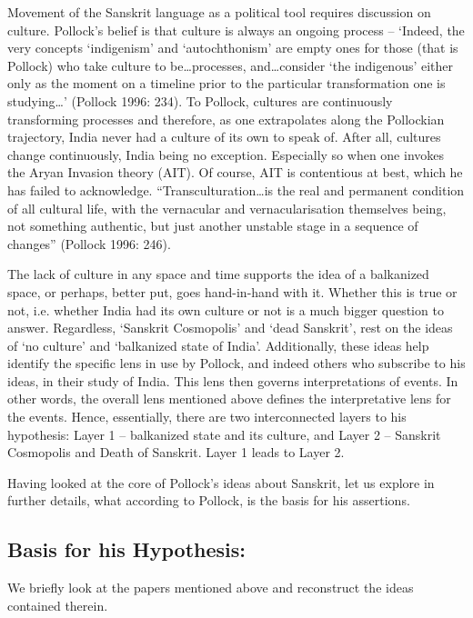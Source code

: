 Movement of the Sanskrit language as a political tool requires discussion on culture. Pollock’s belief is that culture is always an ongoing process – ‘Indeed, the very concepts ‘indigenism’ and ‘autochthonism’ are empty ones for those (that is Pollock) who take culture to be…processes, and…consider ‘the indigenous’ either only as the moment on a timeline prior to the particular transformation one is studying…’ (Pollock 1996: 234). To Pollock, cultures are continuously transforming processes and therefore, as one extrapolates along the Pollockian trajectory, India never had a culture of its own to speak of. After all, cultures change continuously, India being no exception. Especially so when one invokes the Aryan Invasion theory (AIT). Of course, AIT is contentious at best, which he has failed to acknowledge. “Transculturation…is the real and permanent condition of all cultural life, with the vernacular and vernacularisation themselves being, not something authentic, but just another unstable stage in a sequence of changes” (Pollock 1996: 246).

The lack of culture in any space and time supports the idea of a balkanized space, or perhaps, better put, goes hand-in-hand with it. Whether this is true or not, i.e. whether India had its own culture or not is a much bigger question to answer. Regardless, ‘Sanskrit Cosmopolis’ and ‘dead Sanskrit’, rest on the ideas of ‘no culture’ and ‘balkanized state of India’. Additionally, these ideas help identify the specific lens in use by Pollock, and indeed others who subscribe to his ideas, in their study of India. This lens then governs interpretations of events. In other words, the overall lens mentioned above defines the interpretative lens for the events. Hence, essentially, there are two interconnected layers to his hypothesis: Layer 1 – balkanized state and its culture, and Layer 2 – Sanskrit Cosmopolis and Death of Sanskrit. Layer 1 leads to Layer 2.

Having looked at the core of Pollock’s ideas about Sanskrit, let us explore in further details, what according to Pollock, is the basis for his assertions.

\subsection*{Basis for his Hypothesis:}

We briefly look at the papers mentioned above and reconstruct the ideas contained therein.

